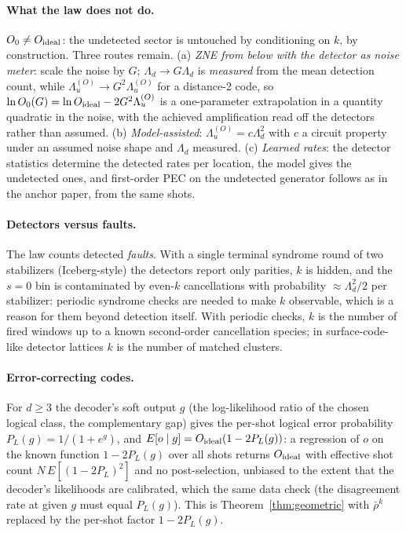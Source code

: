 \documentclass[11pt,a4paper]{article}
\theoremstyle{remark}
\begin{document}
\paragraph{What the law does not do.} $O_0\neq O_{\rm ideal}$: the undetected sector is untouched by conditioning on $k$, by construction. Three routes remain. (a) \emph{ZNE from below with the detector as noise meter}: scale the noise by $G$; $\Lambda_d\to G\Lambda_d$ is \emph{measured} from the mean detection count, while $\Lambda_u^{(O)}\to G^2\Lambda_u^{(O)}$ for a distance-2 code, so $\ln O_0(G)=\ln O_{\rm ideal}-2G^2\Lambda_u^{(O)}$ is a one-parameter extrapolation in a quantity quadratic in the noise, with the achieved amplification read off the detectors rather than assumed. (b) \emph{Model-assisted}: $\Lambda_u^{(O)}=c\Lambda_d^2$ with $c$ a circuit property under an assumed noise shape and $\Lambda_d$ measured. (c) \emph{Learned rates}: the detector statistics determine the detected rates per location, the model gives the undetected ones, and first-order PEC on the undetected generator follows as in the anchor paper, from the same shots.

\paragraph{Detectors versus faults.} The law counts detected \emph{faults}. With a single terminal syndrome round of two stabilizers (Iceberg-style) the detectors report only parities, $k$ is hidden, and the $s=0$ bin is contaminated by even-$k$ cancellations with probability $\approx\Lambda_d^2/2$ per stabilizer: periodic syndrome checks are needed to make $k$ observable, which is a reason for them beyond detection itself. With periodic checks, $k$ is the number of fired windows up to a known second-order cancellation species; in surface-code-like detector lattices $k$ is the number of matched clusters.

\paragraph{Error-correcting codes.} For $d\ge3$ the decoder's soft output $g$ (the log-likelihood ratio of the chosen logical class, the complementary gap) gives the per-shot logical error probability $P_L(g)=1/(1+e^{g})$, and $E[o\mid g]=O_{\rm ideal}(1-2P_L(g))$: a regression of $o$ on the known function $1-2P_L(g)$ over all shots returns $O_{\rm ideal}$ with effective shot count $N\,E[(1-2P_L)^2]$ and no post-selection, unbiased to the extent that the decoder's likelihoods are calibrated, which the same data check (the disagreement rate at given $g$ must equal $P_L(g)$). This is Theorem~\ref{thm:geometric} with $\bar\rho^k$ replaced by the per-shot factor $1-2P_L(g)$.
\end{document}
